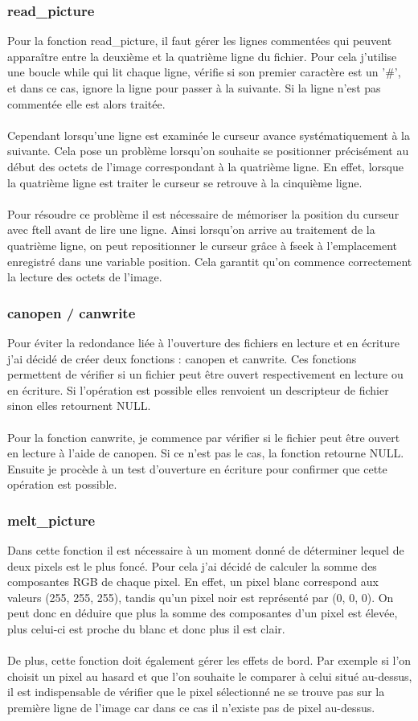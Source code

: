 \documentclass[12pt,a4paper]{article}
\begin{document}
\subsubsection{read\_picture}
Pour la fonction read\_picture, il faut gérer les lignes commentées qui peuvent apparaître entre la deuxième et la quatrième ligne du fichier. Pour cela j'utilise une boucle while qui lit chaque ligne, vérifie si son premier caractère est un '\#', et dans ce cas, ignore la ligne pour passer à la suivante. Si la ligne n'est pas commentée elle est alors traitée.\\
\\
Cependant lorsqu'une ligne est examinée le curseur avance systématiquement à la suivante. Cela pose un problème lorsqu'on souhaite se positionner précisément au début des octets de l'image correspondant à la quatrième ligne. En effet, lorsque la quatrième ligne est traiter le curseur se retrouve à la cinquième ligne.\\
\\
Pour résoudre ce problème il est nécessaire de mémoriser la position du curseur avec ftell avant de lire une ligne. Ainsi lorsqu'on arrive au traitement de la quatrième ligne, on peut repositionner le curseur grâce à fseek à l'emplacement enregistré dans une variable position. Cela garantit qu'on commence correctement la lecture des octets de l'image.
\subsubsection{canopen / canwrite}
Pour éviter la redondance liée à l'ouverture des fichiers en lecture et en écriture j'ai décidé de créer deux fonctions : canopen et canwrite. Ces fonctions permettent de vérifier si un fichier peut être ouvert respectivement en lecture ou en écriture. Si l'opération est possible elles renvoient un descripteur de fichier sinon elles retournent NULL.\\
\\
Pour la fonction canwrite, je commence par vérifier si le fichier peut être ouvert en lecture à l'aide de canopen. Si ce n'est pas le cas, la fonction retourne NULL. Ensuite je procède à un test d'ouverture en écriture pour confirmer que cette opération est possible.
\subsubsection{melt\_picture}
Dans cette fonction il est nécessaire à un moment donné de déterminer lequel de deux pixels est le plus foncé. Pour cela j'ai décidé de calculer la somme des composantes RGB de chaque pixel. En effet, un pixel blanc correspond aux valeurs (255, 255, 255), tandis qu'un pixel noir est représenté par (0, 0, 0). On peut donc en déduire que plus la somme des composantes d'un pixel est élevée, plus celui-ci est proche du blanc et donc plus il est clair.\\
\\
De plus, cette fonction doit également gérer les effets de bord. Par exemple si l'on choisit un pixel au hasard et que l'on souhaite le comparer à celui situé au-dessus, il est indispensable de vérifier que le pixel sélectionné ne se trouve pas sur la première ligne de l'image car dans ce cas il n'existe pas de pixel au-dessus.
\end{document}
